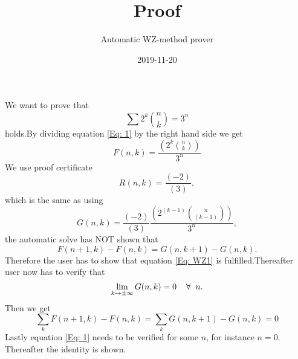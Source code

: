 \documentclass{article}
\title{Proof}
\author{Automatic WZ-method prover}
\date{2019-11-20}
\let\oldforall\forall
\renewcommand{\forall}{\hspace*{2mm}\oldforall\hspace*{1mm}}
\begin{document}
\maketitle
We want to prove that
\begin{equation}\label{Eq: 1}
\sum 2^k\binom{n}{k} = 3^n
\end{equation}
holds.By dividing equation \ref{Eq: 1} by the right hand side we get
\begin{equation}
F(n,k)=\frac{(2^{k}\binom{n}{k})}{3^{n}}
\end{equation}
We use proof certificate
\begin{equation}
R(n,k)=\frac{(-2)}{(3)},
\end{equation}
which is the same as using
\begin{equation}
G(n,k)=\frac{(-2)}{(3)}\frac{(2^{(k-1)}\binom{n}{(k-1)})}{3^{n}},
\end{equation}
the automatic solve has NOT shown that
\begin{equation}\label{Eq: WZ1}
F(n+1,k)-F(n,k)=G(n,k+1)-G(n,k).
\end{equation}
Therefore the user has to show that equation \ref{Eq: WZ1} is fulfilled.Thereafter user now has to verify that
\begin{equation}
\lim_{k\to\pm\infty}G(n,k)=0\forall n.
\end{equation}
Then we get
\begin{equation}
\sum_k F(n+1,k)-F(n,k)=\sum_k G(n,k+1)-G(n,k)=0\end{equation}Lastly equation \ref{Eq: 1} needs to be verified for some $n$, for instance $n=0$. Thereafter the identity is shown.
\end{document}
